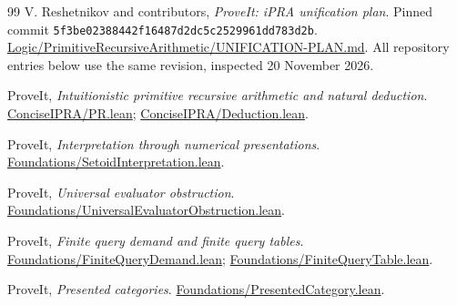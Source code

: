 \begin{thebibliography}{99}
V. Reshetnikov and contributors, \emph{ProveIt: iPRA unification plan}.
Pinned commit \texttt{5f3be02388442f16487d2dc5c2529961dd783d2b}.
\href{https://github.com/VladimirReshetnikov/ProveIt/blob/5f3be02388442f16487d2dc5c2529961dd783d2b/Logic/PrimitiveRecursiveArithmetic/UNIFICATION-PLAN.md}{Logic/PrimitiveRecursiveArithmetic/UNIFICATION-PLAN.md}.
All repository entries below use the same revision, inspected 20 November 2026.

ProveIt, \emph{Intuitionistic primitive recursive arithmetic and natural deduction}.
\href{https://github.com/VladimirReshetnikov/ProveIt/blob/5f3be02388442f16487d2dc5c2529961dd783d2b/Logic/PrimitiveRecursiveArithmetic/ConciseIPRA/Lean/ConciseIPRA/PR.lean}{ConciseIPRA/PR.lean};
\href{https://github.com/VladimirReshetnikov/ProveIt/blob/5f3be02388442f16487d2dc5c2529961dd783d2b/Logic/PrimitiveRecursiveArithmetic/ConciseIPRA/Lean/ConciseIPRA/Deduction.lean}{ConciseIPRA/Deduction.lean}.

ProveIt, \emph{Interpretation through numerical presentations}.
\href{https://github.com/VladimirReshetnikov/ProveIt/blob/5f3be02388442f16487d2dc5c2529961dd783d2b/Logic/PrimitiveRecursiveArithmetic/Derivations/Lean/IPRADerivations/Foundations/SetoidInterpretation.lean}{Foundations/SetoidInterpretation.lean}.

ProveIt, \emph{Universal evaluator obstruction}.
\href{https://github.com/VladimirReshetnikov/ProveIt/blob/5f3be02388442f16487d2dc5c2529961dd783d2b/Logic/PrimitiveRecursiveArithmetic/Derivations/Lean/IPRADerivations/Foundations/UniversalEvaluatorObstruction.lean}{Foundations/UniversalEvaluatorObstruction.lean}.

ProveIt, \emph{Finite query demand and finite query tables}.
\href{https://github.com/VladimirReshetnikov/ProveIt/blob/5f3be02388442f16487d2dc5c2529961dd783d2b/Logic/PrimitiveRecursiveArithmetic/Derivations/Lean/IPRADerivations/Foundations/FiniteQueryDemand.lean}{Foundations/FiniteQueryDemand.lean};
\href{https://github.com/VladimirReshetnikov/ProveIt/blob/5f3be02388442f16487d2dc5c2529961dd783d2b/Logic/PrimitiveRecursiveArithmetic/Derivations/Lean/IPRADerivations/Foundations/FiniteQueryTable.lean}{Foundations/FiniteQueryTable.lean}.

ProveIt, \emph{Presented categories}.
\href{https://github.com/VladimirReshetnikov/ProveIt/blob/5f3be02388442f16487d2dc5c2529961dd783d2b/Logic/PrimitiveRecursiveArithmetic/Derivations/Lean/IPRADerivations/Foundations/PresentedCategory.lean}{Foundations/PresentedCategory.lean}.


\end{thebibliography}
